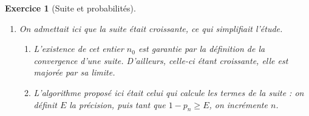 \documentclass[12pt,a4paper]{article}
\theoremstyle{break}
\theoremstyle{nobreak}
\newtheorem{exercice}{Exercice}
\theoremstyle{nonumberplain}
\begin{document}
\begin{exercice}[Suite et probabilités]
\begin{enumerate}
\begin{enumerate}
          Un élève a pensé à vérifier que cette égalité était vraie pour
          $n=1$, mais dans le cadre d'un raisonnement par récurrence qui
          était inutile ici.
        \item La limite de cette suite a donné lieu à des résultats
          étranges : certains élèves ont oublié qu'il s'agissait de
          probabilité et que le résultat était entre 0 et 1. Bien peu se
          sont donnés la peine de vérifier la cohérence du résultat avec
          l'énoncé de départ. En effet, il y'a «plus de chance que le 6
          vienne du dé rouge que du dé vert» donc si on connaît la
          probabilité d'avoir obtenu 6, la probabilité de venir du dé
          rouge est grande.
      \end{enumerate}
    \item On admettait ici que la suite était croissante, ce qui
      simplifiait l'étude.
      \begin{enumerate}
        \item L'existence de cet entier $n_0$ est garantie par la
          définition de la convergence d'une suite. D'ailleurs, celle-ci
          étant croissante, elle est majorée par sa limite.
        \item L'algorithme proposé ici était celui qui calcule les
          termes de la suite : on définit $E$ la précision, puis tant
          que $ 1 - p_n \geqslant E$, on incrémente $n$.
      \end{enumerate}
  \end{enumerate}
\end{exercice}
\end{document}
